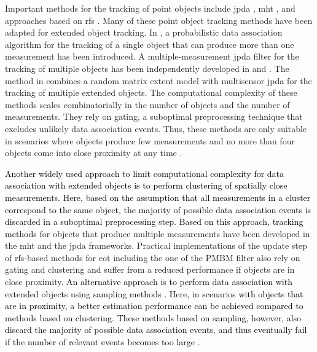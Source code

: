 \documentclass[10pt, twoside, romanappendices]{IEEEtran}
\providecommand{\rd}{\textcolor{black}}
\begin{document}
Important methods for the tracking of point objects include \ac{jpda} \cite{BarWilTia:B11}, \ac{mht} \cite{Rei:J79,Kur:B90,CorCar:J05}, and approaches based on \ac{rfs} \cite{Mah:B07,VoSinDou:J05,VoVoCan:J07,VoVoPhu:J14,Wil:J15}. Many of these point object tracking methods have been adapted for extended object tracking. In \cite{HabThaKirGriWak:C11}, a probabilistic data association algorithm for the tracking of a single object that can produce more than one measurement has been introduced. A multiple-measurement \ac{jpda} filter for the tracking of multiple objects has been independently developed in \cite{HamSveSanSor:J12} and \cite{HabThaThaMalKir:J13}. The method in \cite{SchReuWan:C15} combines a random matrix extent model with multisensor \ac{jpda} for the tracking of multiple extended objects. The computational complexity of these methods scales combinatorially in the number of objects and the number of measurements. They rely on gating, a suboptimal preprocessing technique that excludes unlikely data association events. Thus, these methods are only suitable in scenarios where objects produce few measurements and no more than four objects come into close proximity at any time \cite{MeyWin:J20}.

\rd{Another widely used approach to limit computational complexity for data association with extended objects is to perform clustering of spatially close measurements. Here, based on the assumption that all measurements in a cluster correspond to the same object, the majority of possible data association events is discarded in a suboptimal preprocessing step. Based on this approach, tracking methods} for objects that produce multiple measurements have been developed in the \ac{mht} \cite{CorCar:J18} and the \ac{jpda} \cite{GenVivBraSolAmi:J15,VivBra:J16} frameworks. Practical implementations of the update step of \ac{rfs}-based methods for \ac{eot} \cite{GraLunOrg:J12,BeaReuGraVoVoSch:J16,GraFatSve:J19,XiaGraSve:C19} including the one of the PMBM filter \cite{GraFatSve:J19} also rely on gating and clustering and suffer from a reduced performance if objects are in close proximity. \rd{An alternative approach is to perform data association with extended objects using sampling methods \cite{GraSveReuXiaFat:J18,BoeBauWirReu:C19}. Here, in scenarios with objects that are in proximity, a better estimation performance can be achieved compared to methods based on clustering. These methods based on sampling, however, also discard the majority of possible data association events, and thus eventually fail if the number of relevant events becomes too large \cite{KroMeyHla:J20}.}
\end{document}
